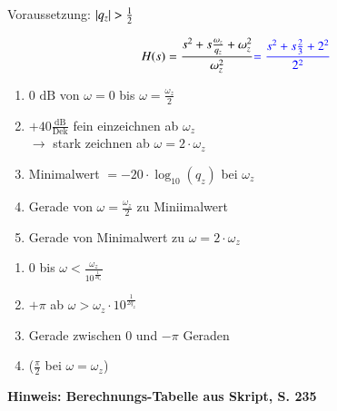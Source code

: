 \begin{minipage}[t]{0.48\columnwidth}
    \raggedright
    \begin{center}
        Voraussetzung: $\left|q_z\right| > \frac{1}{2}$
    \end{center}
    $$ H(s) = \frac{s^2 + s \frac{\omega_z}{q_z} + \omega_z^2}{\omega_z^2} {\color{blue}= \frac{s^2 + s \frac{2}{3} + 2^2}{2^2}} $$

    
\end{minipage}
\hfill
\begin{minipage}[t]{0.48\columnwidth}
        \begin{enumerate}
            \item 0 $\text{dB}$ von $\omega=0$ bis $\omega=\frac{\omega_z}{2}$
            \item $+40\frac{\text{dB}}{\text{Dek}}$ fein einzeichnen ab $\omega_z$\\
            $\rightarrow$ stark zeichnen ab $\omega = 2 \cdot \omega_z$
            \item Minimalwert $= -20\cdot \log_{10}(q_z)$ bei $\omega_z$
            \item Gerade von $\omega=\frac{\omega_z}{2}$ zu Miniimalwert 
            \item Gerade von Minimalwert zu $\omega = 2 \cdot \omega_z$\\
        \end{enumerate}
        \begin{enumerate}
            \item 0 bis $\omega < \frac{\omega_z}{10^{\frac{1}{2 q_z}}}$
            \item $+ \pi$ ab $\omega > \omega_z \cdot 10^{\frac{1}{2 q_z}}$
            \item Gerade zwischen $0$ und $- \pi$ Geraden
            \item ($\frac{\pi}{2}$ bei $\omega = \omega_z$)\\
        \end{enumerate}
\end{minipage}

\textbf{Hinweis: Berechnungs-Tabelle aus Skript, S. 235} 

\begingroup
\renewcommand{\arraystretch}{2}
\setlength{\tabcolsep}{0mm}
\endgroup
\renewcommand{\arraystretch}{1}

